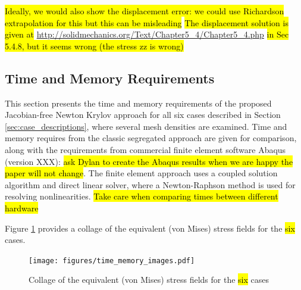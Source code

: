 \documentclass[sn-mathphys,Numbered,draft]{sn-jnl}%
\begin{document}
\hl{Ideally, we would also show the displacement error: we could use Richardson extrapolation for this but this can be misleading}
\hl{The displacement solution is given at} \url{http://solidmechanics.org/Text/Chapter5_4/Chapter5_4.php}
\hl{in Sec 5.4.8, but it seems wrong (the stress zz is wrong)}


\subsection{Time and Memory Requirements}
This section presents the time and memory requirements of the proposed Jacobian-free Newton Krylov approach for all six cases described in Section \ref{sec:case_descriptions}, where several mesh densities are examined.
Time and memory requires from the classic segregated approach are given for comparison, along with the requirements from commercial finite element software Abaqus (version XXX): \hl{ask Dylan to create the Abaqus results when we are happy the paper will not change}.
The finite element approach uses a coupled solution algorithm and direct linear solver, where a Newton-Raphson method is used for resolving nonlinearities.
\hl{Take care when comparing times between different hardware}

Figure \ref{fig:time_memory_images} provides a collage of the equivalent (von Mises) stress fields for the \hl{six} cases.
\begin{figure}[htbp]
   \centering
   \texttt{[image: figures/time\_memory\_images.pdf]} 
   \caption{Collage of the equivalent (von Mises) stress fields for the \hl{six} cases}
   \label{fig:time_memory_images}
\end{figure}
\end{document}

